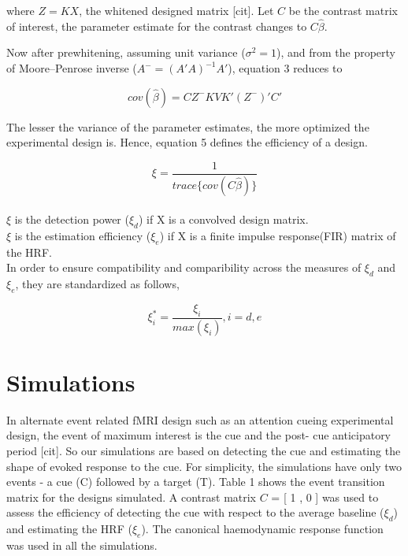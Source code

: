 \documentclass[11pt]{article}
\begin{document}
where \(Z = KX\), the whitened designed matrix [cit]. Let $C$ be the contrast matrix of interest, the parameter estimate for the contrast changes to \(C\hat{\beta}\).\par

Now after prewhitening, assuming unit variance (\(\sigma^2 = 1\)), and from the property of Moore–Penrose inverse (\(A^-=(A'A)^{-1}A'\)), equation 3 reduces to

\begin{equation}
    cov(\hat{\beta}) = CZ^-KVK'(Z^-)'C'
\end{equation}

The lesser the variance of the parameter estimates, the more optimized the experimental design is. Hence, equation 5 defines the efficiency of a design.

\begin{equation}
    \xi = \frac{1} {trace\{cov(C\hat{\beta})\}}
\end{equation}
\\
\(\xi\) is the detection power (\(\xi_d\)) if X is a convolved design matrix.\\
\(\xi\) is the estimation efficiency (\(\xi_e\)) if X is a finite impulse response(FIR) matrix of the HRF.\\ In order to ensure compatibility and comparibility across the measures of \(\xi_d\) and \(\xi_e\), they are standardized as follows,

\begin{equation}
    \xi_i^* = \frac{\xi_i} {max(\xi_i)}, i = d , e
\end{equation}


\section{Simulations}
In alternate event related fMRI design such as an attention cueing experimental design, the event of maximum interest is the cue and the post- cue anticipatory period [cit]. So our simulations are based on detecting the cue and estimating the shape of evoked response to the cue. For simplicity, the simulations have only two events - a cue (C) followed by a target (T). Table 1 shows the event transition matrix for the designs simulated. A contrast matrix $C$ = [ 1 , 0 ] was used to assess the efficiency of detecting the cue with respect to the average baseline (\(\xi_d\)) and estimating the HRF (\(\xi_e\)). The canonical haemodynamic response function was used in all the simulations.
\end{document}
